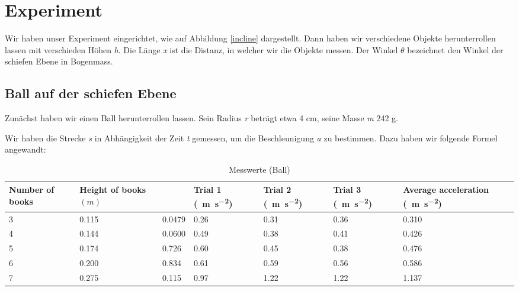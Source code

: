 \documentclass[a4paper, titlepage]{article}
\newcommand{\accunit}[1]{\SI{#1}{\metre\per\square\second}}
\begin{document}
    \section{Experiment}
    Wir haben unser Experiment eingerichtet, wie auf Abbildung
    \ref{incline} dargestellt. Dann haben wir verschiedene Objekte
    herunterrollen lassen mit verschieden Höhen
    \emph{h}. Die Länge \emph{x} ist die Distanz, in welcher
    wir die Objekte messen. Der Winkel $\theta$ bezeichnet
    den Winkel der schiefen Ebene in Bogenmass.

    \subsection{Ball auf der schiefen Ebene}
    Zunächst haben wir einen Ball herunterrollen lassen.
    Sein Radius \emph{r} beträgt etwa 4 cm, seine Masse
    \emph{m} 242 g.
    
    Wir haben die Strecke \emph{s} in Abhängigkeit
    der Zeit \emph{t} gemessen, um die Beschleunigung
    \emph{a} zu bestimmen. Dazu haben wir folgende Formel
    angewandt:



    \begin{table}
        \begin{tabularx}{\textwidth}{|X|X|X|X|X|X|X|}
            \hline
            \textbf{Number of books} & \textbf{Height of books $(m)$} & 
            \boldmath{$\sin{\theta}$} & \textbf{Trial 1}
            (\accunit{}) & 
            \textbf{Trial 2} (\accunit{}) & 
            \textbf{Trial 3} (\accunit{}) & 
            \textbf{Average acceleration} (\accunit{}) \\
            \hline
            3 & 0.115 & 0.0479 & 0.26 & 0.31 & 0.36 & 0.310 \\
            \hline
            4 & 0.144 & 0.0600 & 0.49 & 0.38 & 0.41 & 0.426 \\
            \hline
            5 & 0.174 & 0.726 & 0.60 & 0.45 & 0.38 & 0.476 \\
            \hline
            6 & 0.200 & 0.834 & 0.61 & 0.59 & 0.56 & 0.586 \\
            \hline
            7 & 0.275 & 0.115 & 0.97 & 1.22 & 1.22 & 1.137 \\
            \hline
        \end{tabularx}
        \caption{Messwerte (Ball)}
    \end{table}
\end{document}

